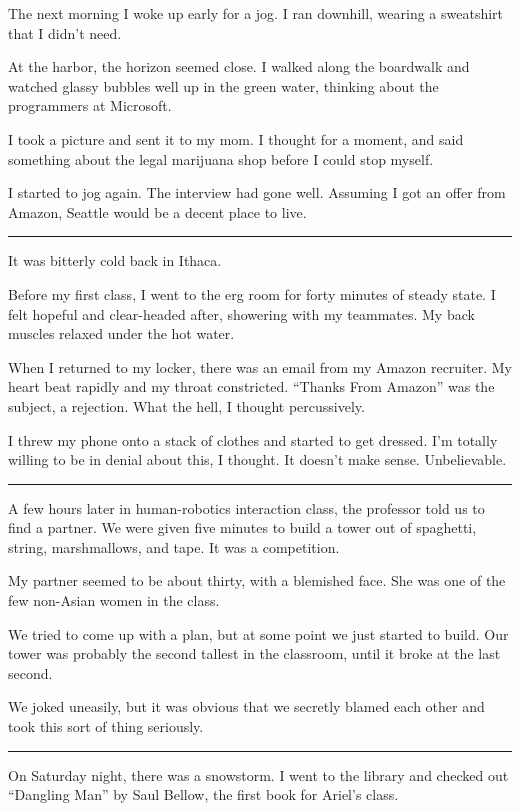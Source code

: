 The next morning I woke up early for a jog.  I ran downhill, wearing a
sweatshirt that I didn't need.

At the harbor, the horizon seemed close.  I walked along the boardwalk and
watched glassy bubbles well up in the green water, thinking about the
programmers at Microsoft.

I took a picture and sent it to my mom.  I thought for a moment, and said
something about the legal marijuana shop before I could stop myself.

I started to jog again.  The interview had gone well.  Assuming I got an offer
from Amazon, Seattle would be a decent place to live.

\plainfancybreak{12pt}{2}{}

It was bitterly cold back in Ithaca.

Before my first class, I went to the erg room for forty minutes of steady state.
I felt hopeful and clear-headed after, showering with my teammates. My back
muscles relaxed under the hot water.

When I returned to my locker, there was an email from my Amazon recruiter. My
heart beat rapidly and my throat constricted. ``Thanks From Amazon'' was the
subject, a rejection.  What the hell, I thought percussively.

I threw my phone onto a stack of clothes and started to get dressed. I'm
totally willing to be in denial about this, I thought. It doesn't make sense.
Unbelievable.

\plainfancybreak{12pt}{2}{}

A few hours later in human-robotics interaction class, the professor told us to
find a partner. We were given five minutes to build a tower out of spaghetti,
string, marshmallows, and tape.  It was a competition.

My partner seemed to be about thirty, with a blemished face. She was one of the
few non-Asian women in the class.

We tried to come up with a plan, but at some point we just started to build. Our
tower was probably the second tallest in the classroom, until it broke at the
last second.

We joked uneasily, but it was obvious that we secretly blamed each other and
took this sort of thing seriously.

\plainfancybreak{12pt}{2}{}

On Saturday night, there was a snowstorm.  I went to the library and checked out
``Dangling Man'' by Saul Bellow, the first book for Ariel's class.

